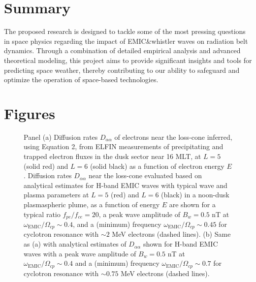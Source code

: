 \documentclass[
  letterpaper,
  DIV=11,
  numbers=noendperiod]{scrartcl}
\begin{document}
\section{Summary}\label{summary}

The proposed research is designed to tackle some of the most pressing questions in space physics regarding the impact of EMIC\&whistler waves on radiation belt dynamics. Through a combination of detailed empirical analysis and advanced theoretical modeling, this project aims to provide significant insights and tools for predicting space weather, thereby contributing to our ability to safeguard and optimize the operation of space-based technologies.

\section{Figures}\label{figures}

\begin{figure}


\caption{\label{fig-Daa_EMIC}Panel (a) Diffusion rates \(D_{\alpha\alpha}\) of electrons near the loss-cone inferred, using Equation 2, from ELFIN measurements of precipitating and trapped electron fluxes in the dusk sector near 16 MLT, at \(L=5\) (solid red) and \(L=6\) (solid black) as a function of electron energy \(E\). Diffusion rates \(D_{\alpha\alpha}\) near the loss-cone evaluated based on analytical estimates for H-band EMIC waves with typical wave and plasma parameters at \(L=5\) (red) and \(L=6\) (black) in a noon-dusk plasmaspheric plume, as a function of energy \(E\) are shown for a typical ratio \(f_{pe}/f_{ce}=20\), a peak wave amplitude of \(B_w=0.5\) nT at \(\omega_{\text{EMIC}}/\Omega_{cp}\sim 0.4\), and a (minimum) frequency \(\omega_{\text{EMIC}}/\Omega_{cp}\sim 0.45\) for cyclotron resonance with \(\sim2\) MeV electrons (dashed lines). (b) Same as (a) with analytical estimates of \(D_{\alpha\alpha}\) shown for H-band EMIC waves with a peak wave amplitude of \(B_w=0.5\) nT at \(\omega_{\text{EMIC}}/\Omega_{cp}\sim 0.4\) and a (minimum) frequency \(\omega_{\text{EMIC}}/\Omega_{cp}\sim 0.7\) for cyclotron resonance with \(\sim0.75\) MeV electrons (dashed lines).}

\end{figure}%

\newpage{}


  



\end{document}
